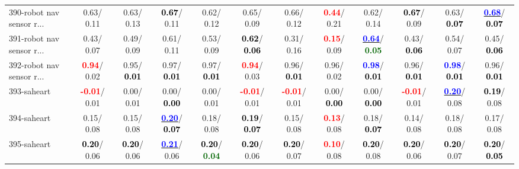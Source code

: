 \begin{table}[h]
\begin{center}
{\begin{tabular}{lc|c|c|c|c|c|c|c|c|c|c}
390-robot nav sensor r... &   0.63/  0.11 &   0.63/  0.13 & \textcolor{black}{\textbf{  0.67}}/  0.11 &   0.62/  0.12 &   0.65/  0.09 &   0.66/  0.12 & \textcolor{red}{\textbf{  0.44}}/  0.21 &   0.62/  0.14 & \textcolor{black}{\textbf{  0.67}}/  0.09 &   0.63/\textcolor{black}{\textbf{  0.07}} & \underline{\textcolor{blue}{\textbf{  0.68}}}/\textcolor{black}{\textbf{  0.07}} \\
391-robot nav sensor r... &   0.43/  0.07 &   0.49/  0.09 &   0.61/  0.11 &   0.53/  0.09 & \textcolor{black}{\textbf{  0.62}}/\textcolor{black}{\textbf{  0.06}} &   0.31/  0.16 & \textcolor{red}{\textbf{  0.15}}/  0.09 & \underline{\textcolor{blue}{\textbf{  0.64}}}/\textcolor{darkgreen}{\textbf{  0.05}} &   0.43/\textcolor{black}{\textbf{  0.06}} &   0.54/  0.07 &   0.45/\textcolor{black}{\textbf{  0.06}} \\ \hline
392-robot nav sensor r... & \textcolor{red}{\textbf{  0.94}}/  0.02 &   0.95/\textcolor{black}{\textbf{  0.01}} &   0.97/\textcolor{black}{\textbf{  0.01}} &   0.97/\textcolor{black}{\textbf{  0.01}} & \textcolor{red}{\textbf{  0.94}}/  0.03 &   0.96/\textcolor{black}{\textbf{  0.01}} &   0.96/  0.02 & \textcolor{blue}{\textbf{  0.98}}/\textcolor{black}{\textbf{  0.01}} &   0.96/\textcolor{black}{\textbf{  0.01}} & \textcolor{blue}{\textbf{  0.98}}/\textcolor{black}{\textbf{  0.01}} &   0.96/\textcolor{black}{\textbf{  0.01}} \\
393-saheart & \textcolor{red}{\textbf{ -0.01}}/  0.01 &   0.00/  0.01 &   0.00/\textcolor{black}{\textbf{  0.00}} &   0.00/  0.01 & \textcolor{red}{\textbf{ -0.01}}/  0.01 & \textcolor{red}{\textbf{ -0.01}}/  0.01 &   0.00/\textcolor{black}{\textbf{  0.00}} &   0.00/\textcolor{black}{\textbf{  0.00}} & \textcolor{red}{\textbf{ -0.01}}/  0.01 & \underline{\textcolor{blue}{\textbf{  0.20}}}/  0.08 & \textcolor{black}{\textbf{  0.19}}/  0.08 \\
394-saheart &   0.15/  0.08 &   0.15/  0.08 & \underline{\textcolor{blue}{\textbf{  0.20}}}/\textcolor{black}{\textbf{  0.07}} &   0.18/  0.08 & \textcolor{black}{\textbf{  0.19}}/\textcolor{black}{\textbf{  0.07}} &   0.15/  0.08 & \textcolor{red}{\textbf{  0.13}}/  0.08 &   0.18/\textcolor{black}{\textbf{  0.07}} &   0.14/  0.08 &   0.18/  0.08 &   0.17/  0.08 \\
395-saheart & \textcolor{black}{\textbf{  0.20}}/  0.06 & \textcolor{black}{\textbf{  0.20}}/  0.06 & \underline{\textcolor{blue}{\textbf{  0.21}}}/  0.06 & \textcolor{black}{\textbf{  0.20}}/\textcolor{darkgreen}{\textbf{  0.04}} & \textcolor{black}{\textbf{  0.20}}/  0.06 & \textcolor{black}{\textbf{  0.20}}/  0.07 & \textcolor{red}{\textbf{  0.10}}/  0.08 & \textcolor{black}{\textbf{  0.20}}/  0.08 & \textcolor{black}{\textbf{  0.20}}/  0.06 & \textcolor{black}{\textbf{  0.20}}/  0.07 & \textcolor{black}{\textbf{  0.20}}/\textcolor{black}{\textbf{  0.05}} \\

\end{tabular}}
\end{center}
\end{table}
